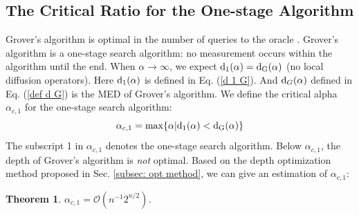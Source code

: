 \documentclass[%
 twocolumn,
 10pt,
 superscriptaddress,
 longbibliography,
 amsmath,amssymb,
 aps,
 pra,
floatfix,
]{revtex4-1}
\newcommand{\eq}{\begin{equation}}
\newcommand{\en}{\end{equation}}
\newtheorem{theo}{Theorem}
\begin{document}
\subsection{\label{sec: one stage alpha}The Critical Ratio for the One-stage Algorithm}

Grover's algorithm is optimal in the number of queries to the oracle \cite{BBHT98,Zalka99}. Grover's algorithm is a one-stage search algorithm: no measurement occurs within the algorithm until the end. When $\alpha\rightarrow\infty$, we expect ${\rm d}_1(\alpha)=\text d_\text{G}(\alpha)$ (no local diffusion operators). Here ${\rm d}_1(\alpha)$ is defined in Eq. (\ref{d 1 G}). And $\text d_G(\alpha)$ defined in Eq. (\ref{def d G}) is the MED of Grover's algorithm. We define the critical alpha $\alpha_{c,1}$ for the one-stage search algorithm:
\eq
\label{def alpha c}
\alpha_{c,1}=\max\{\alpha|{\text d}_1(\alpha) <{\text d}_{\text G}(\alpha)\}
\en
The subscript 1 in $\alpha_{c,1}$ denotes the one-stage search algorithm. Below $\alpha_{c,1}$, the depth of Grover's algorithm is {\it not} optimal. Based on the depth optimization method proposed in Sec. \ref{subsec: opt method}, we can give an estimation of $\alpha_{c,1}$:
\begin{theo}
    \label{theorem 1} $\alpha_{c,1}=\mathcal O(n^{-1}2^{n/2})$. 
\end{theo}	
\end{document}
